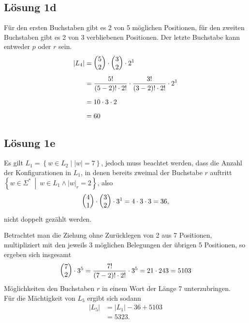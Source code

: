 \documentclass[main.tex]{subfiles}
\begin{document}
\subsection{Lösung 1d}
Für den ersten Buchstaben gibt es 2 von 5 möglichen Positionen, für den zweiten Buchstaben gibt es 2 von 3 verbliebenen Positionen.
Der letzte Buchstabe kann entweder $p$ oder $r$ sein.
\begin{align*}
    |L_4| &= \vektor{5\\ 2} \cdot \vektor{3\\ 2} \cdot 2^1 \\[1mm]
        &= \frac{5!}{(5-2)!\cdot 2!} \cdot \frac{3!}{(3-2)!\cdot 2!} \cdot 2^1 \\[2mm]
        &= 10 \cdot 3 \cdot 2 \\[2mm]
        &= 60
\end{align*}

\subsection{Lösung 1e}

Es gilt $L_1 = \left\{w \in L_2 \middle| |w|=7\right\}$, jedoch muss beachtet werden, dass die Anzahl der Konfigurationen in $L_1$,
in denen bereits zweimal der Buchstabe $r$ auftritt $\left\{ w\in \Sigma^*\ \middle|\ w\in L_1 \land |w|_r = 2 \right\}$, also 
$$
    \vektor{4\\1}\cdot \vektor{3\\2}\cdot 3^1 = 4\cdot 3\cdot 3 = 36,
$$
nicht doppelt gezählt werden.

Betrachtet man die Ziehung ohne Zurücklegen von 2 aus 7 Positionen, multipliziert mit den jeweils 3 möglichen Belegungen der übrigen 5 Positionen, so ergeben sich
insgesamt
$$
    \vektor{7\\ 2} \cdot 3^5 = \frac{7!}{(7-2)!\cdot 2!} \cdot 3^5 = 21 \cdot 243 = 5103
$$
Möglichkeiten den Buchstaben $r$ in einem Wort der Länge 7 unterzubringen.\\

Für die Mächtigkeit von $L_5$ ergibt sich sodann
\begin{align*}
    |L_5| &= |L_1| - 36 + 5103 \\[1mm]
          &= 5323.
\end{align*}
\end{document}
